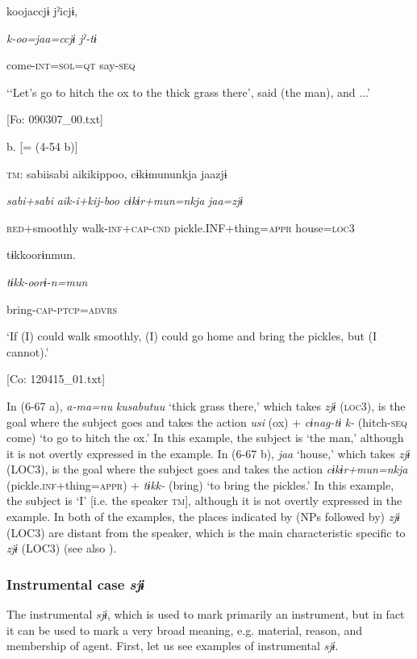       koojaccjɨ  jˀicjɨ,

      \textit{k-oo=jaa=ccjɨ}  \textit{jˀ-tɨ}

      come-\textsc{int}=\textsc{sol}=\textsc{qt}  say-\textsc{seq}

      ‘‘Let’s go to hitch the ox to the thick grass there’, said (the man), and ...’

      [Fo: 090307\_00.txt]

  b.  [= (4-54 b)]

    \textsc{tm}:  sabiisabi  aikikippoo,  cɨkɨmununkja  jaazjɨ

      \textit{sabi+sabi}  \textit{aik-i+kij-boo}  \textit{cɨkɨr+mun=nkja}  \textit{jaa=zjɨ}

      \textsc{red}+smoothly  walk-\textsc{inf}+\textsc{cap}-\textsc{cnd}  pickle.INF+thing=\textsc{appr}  house=\textsc{loc}3

      tɨkkoorɨnmun.

      \textit{tɨkk-oorɨ-n=mun}

      bring-\textsc{cap}-\textsc{ptcp}=\textsc{advrs}

      ‘If (I) could walk smoothly, (I) could go home and bring the pickles, but (I cannot).’

      [Co: 120415\_01.txt]

In (6-67 a), \textit{a-ma=nu} \textit{kusabutuu} ‘thick grass there,’ which takes \textit{zjɨ} (\textsc{loc}3), is the goal where the subject goes and takes the action \textit{usi} (ox) + \textit{cɨnag-tɨ} \textit{k-} (hitch-\textsc{seq} come) ‘to go to hitch the ox.’ In this example, the subject is ‘the man,’ although it is not overtly expressed in the example. In (6-67 b), \textit{jaa} ‘house,’ which takes \textit{zjɨ} (LOC3), is the goal where the subject goes and takes the action \textit{cɨkɨr+mun=nkja} (pickle.\textsc{inf}+thing=\textsc{appr}) + \textit{tɨkk-} (bring) ‘to bring the pickles.’ In this example, the subject is ‘I’ [i.e. the speaker \textsc{tm}], although it is not overtly expressed in the example. In both of the examples, the places indicated by (NPs followed by) \textit{zjɨ} (LOC3) are distant from the speaker, which is the main characteristic specific to \textit{zjɨ} (LOC3) (see also ).

\subsubsection{Instrumental case \textit{sjɨ}}

The instrumental \textit{sjɨ}, which is used to mark primarily an instrument, but in fact it can be used to mark a very broad meaning, e.g. material, reason, and membership of agent. First, let us see examples of instrumental \textit{sjɨ}.

